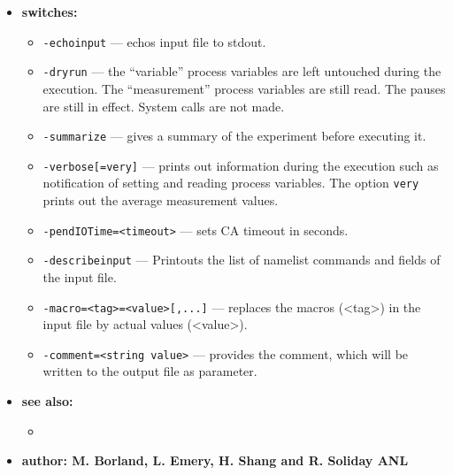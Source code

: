 \begin{itemize}
\item {\bf switches:}
%
%
    \begin{itemize}
    \item {\verb+-echoinput+} --- echos input file to stdout.
    \item {\verb+-dryrun+} --- the ``variable'' process variables are left untouched during the execution. The ``measurement''
                process variables are still read. The pauses are still in effect. System calls are not made.
    \item {\verb+-summarize+} --- gives a summary of the experiment before executing it.
    \item {\verb+-verbose[=very]+} --- prints out information during the execution such as notification of 
                setting and reading process variables. The option \verb+very+ prints out the average measurement values.
    \item {\verb+-pendIOTime=<timeout>+} --- sets CA timeout in seconds.
    \item {\verb+-describeinput+} --- Printouts the list of namelist commands and fields of the input file.
    \item {\verb+-macro=<tag>=<value>[,...]+} --- replaces the macros (<tag>) in the input file by actual values (<value>).
    \item {\verb+-comment=<string value>+} --- provides the comment, which will be written to the output file as parameter.
    \end{itemize}

\item {\bf see also:}
    \begin{itemize}
%
%
    \item {}
    \end{itemize}
%
%
\item {\bf author: M. Borland, L. Emery, H. Shang and R. Soliday ANL} 
\end{itemize}
